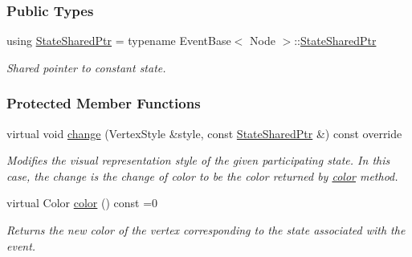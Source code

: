 \subsubsection*{Public Types}
\begin{DoxyCompactItemize}
\item 
using \hyperlink{structslb_1_1ext_1_1event_1_1VertexColor_a34b0eb3328aa86d20ac1af061cc41e7d}{State\+Shared\+Ptr} = typename Event\+Base$<$ Node $>$\+::\hyperlink{structslb_1_1ext_1_1event_1_1UniformChange_a2e6e9605dcd4df428c03c7637fd0d20d}{State\+Shared\+Ptr}\hypertarget{structslb_1_1ext_1_1event_1_1VertexColor_a34b0eb3328aa86d20ac1af061cc41e7d}{}\label{structslb_1_1ext_1_1event_1_1VertexColor_a34b0eb3328aa86d20ac1af061cc41e7d}

\begin{DoxyCompactList}\small\item\em Shared pointer to constant state. \end{DoxyCompactList}\end{DoxyCompactItemize}
\subsubsection*{Protected Member Functions}
\begin{DoxyCompactItemize}
\item 
virtual void \hyperlink{structslb_1_1ext_1_1event_1_1VertexColor_adf28be21a6cec4918687f04c59349667}{change} (Vertex\+Style \&style, const \hyperlink{structslb_1_1ext_1_1event_1_1UniformChange_a2e6e9605dcd4df428c03c7637fd0d20d}{State\+Shared\+Ptr} \&) const override\hypertarget{structslb_1_1ext_1_1event_1_1VertexColor_adf28be21a6cec4918687f04c59349667}{}\label{structslb_1_1ext_1_1event_1_1VertexColor_adf28be21a6cec4918687f04c59349667}

\begin{DoxyCompactList}\small\item\em Modifies the visual representation style of the given participating state. In this case, the change is the change of color to be the color returned by \hyperlink{structslb_1_1ext_1_1event_1_1VertexColor_a651aab95a9f39de56a70273c9d40a76f}{color} method. \end{DoxyCompactList}\item 
virtual Color \hyperlink{structslb_1_1ext_1_1event_1_1VertexColor_a651aab95a9f39de56a70273c9d40a76f}{color} () const =0
\begin{DoxyCompactList}\small\item\em Returns the new color of the vertex corresponding to the state associated with the event. \end{DoxyCompactList}\end{DoxyCompactItemize}
